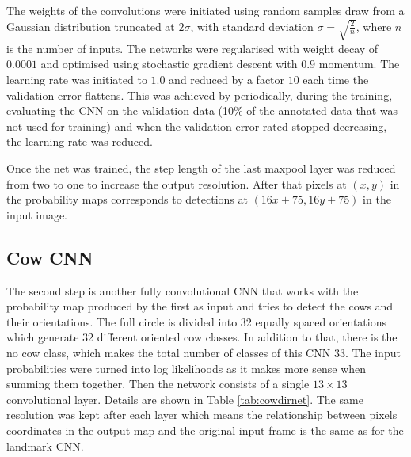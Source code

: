 \documentclass{cta-author}
\begin{document}
The weights of the convolutions were initiated using random samples draw from a Gaussian
distribution truncated at $2\sigma$, with standard deviation $\sigma=\sqrt{\frac{2}{n}}$,
where $n$ is the number of inputs\cite{DBLP:journals/corr/HeZR015}. The networks were regularised with weight
decay of
$0.0001$ and optimised using stochastic gradient descent with $0.9$ momentum. The
learning rate was initiated to $1.0$ and reduced by a factor $10$ each time the validation
error flattens. This was achieved by periodically, during the training, evaluating the CNN on the validation data
(10\% of the annotated data that was not used for training) and when the validation error rated stopped decreasing,
the learning rate was reduced.

Once the net was trained, the step length of the last maxpool layer was reduced from two to one to increase
the output resolution. After that pixels at $\left(x, y\right)$ in the probability maps corresponds to
detections at $\left(16 x + 75, 16 y + 75\right)$ in the input image.

\subsection{Cow CNN}

The second step is another fully convolutional CNN that works with the probability map produced by the first
as input and tries to detect the cows and their orientations. The full circle is divided into 32 equally
spaced orientations which generate 32 different oriented cow classes. In addition to that, there is the no
cow class, which makes the total number of classes of this CNN 33. The input probabilities were turned into
log likelihoods as it makes more sense when summing them together. Then the network consists of a single $ 13
\times 13 $ convolutional layer. Details are shown in Table \ref{tab:cowdirnet}. The same resolution was kept
after each layer which means the relationship between pixels coordinates in the output map and the original
input frame is the same as for the landmark CNN.
\end{document}
